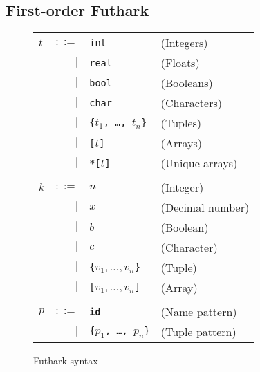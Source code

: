 \documentclass[oneside]{memoir}
\begin{document}
\subsection{First-order Futhark}
\label{sec:fo-futhark}

\begin{figure}[bt]
\begin{tabular}{lrll}
$t$ & $::=$ & \texttt{int} & (Integers) \\
& $|$ & \texttt{real} & (Floats) \\
& $|$ & \texttt{bool} & (Booleans) \\
& $|$ & \texttt{char} & (Characters) \\
& $|$ & \texttt{\{$t_{1}$, \ldots, $t_{n}$\}} & (Tuples) \\
& $|$ & \texttt{[$t$]} & (Arrays) \\
& $|$ & \texttt{*[$t$]} & (Unique arrays) \\
\\
$k$ & $::=$ & $n$ & (Integer)\\
& $|$ & $x$ & (Decimal number) \\
& $|$ & $b$ & (Boolean)\\
& $|$ & $c$ & (Character)\\
& $|$ & \texttt{\{$v_{1},\ldots,v_{n}$\}} & (Tuple) \\
& $|$ & \texttt{[$v_{1},\ldots,v_{n}$]} & (Array) \\
\\
$p$ & $::=$ & \texttt{\textbf{id}} & (Name pattern)\\
& $|$ & \texttt{\{$p_{1}$, \ldots, $p_{n}$\}} & (Tuple pattern) \\
\end{tabular}
\caption{Futhark syntax}
\label{fig:fo-syntax}
\end{figure}
\end{document}
